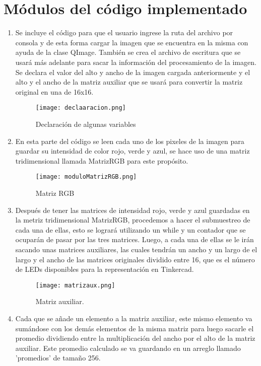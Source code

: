 \documentclass{article}
\begin{document}
\section{Módulos del código implementado} \label{Modulos}
\begin{enumerate}
\item Se incluye el código para que el usuario ingrese la ruta del archivo por consola y de esta forma cargar la imagen que se encuentra en la misma con ayuda de la clase QImage. También se crea el archivo de escritura que se usará más adelante para sacar la información del procesamiento de la imagen.
Se declara el valor del alto y ancho de la imagen cargada anteriormente y el alto y el ancho de la matriz auxiliar que se usará para convertir la matriz original en una de 16x16.

\begin{figure}[h]
\texttt{[image: declaaracion.png]}
\centering
\caption{Declaración de algunas variables}
\label{fig:declaracion}
\end{figure}


\item En esta parte del código se leen cada uno de los pixeles de la imagen para guardar su intensidad de color rojo, verde y azul, se hace uso de una matriz tridimensional llamada MatrizRGB para este propósito.

\begin{figure}[h]
\texttt{[image: moduloMatrizRGB.png]}
\centering
\caption{Matriz RGB}
\label{fig:matrizRGB}
\end{figure}

\item Después de tener las matrices de intensidad rojo, verde y azul guardadas en la metriz tridimensional MatrizRGB, procedemos a hacer el submuestreo de cada una de ellas, esto se logrará utilizando un while y un contador que se ocuparán de pasar por las tres matrices. Luego, a cada una de ellas se le irán sacando unas matrices auxiliares, las cuales tendrán un ancho y un largo de el largo y el ancho de las matrices originales dividido entre 16, que es el número de LEDs disponibles para la representación en Tinkercad.

\begin{figure}[h]
\texttt{[image: matrizaux.png]}
\centering
\caption{Matriz auxiliar.}
\label{fig:matrizaux}
\end{figure}

\item Cada que se añade un elemento a la matriz auxiliar, este mismo elemento va sumándose con los demás elementos de la misma matriz para luego sacarle el promedio dividiendo entre la multiplicación del ancho por el alto de la matriz auxiliar. Este promedio calculado se va guardando en un arreglo llamado 'promedios' de tamaño 256.


\end{enumerate}
\end{document}
